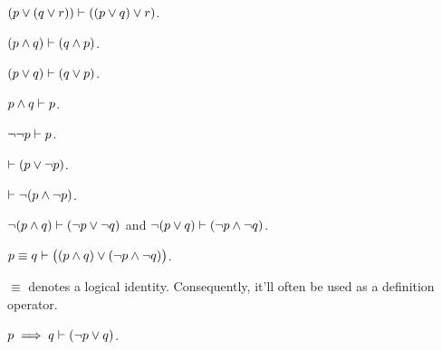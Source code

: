 \begin{definition}
  $(p \lor (q \lor r)) \vdash ((p \lor q) \lor r)$.
\end{definition}

\begin{definition}
  $(p \land q) \vdash (q \land p)$.
\end{definition}

\begin{definition}
  $(p \lor q) \vdash (q \lor p)$.
\end{definition}

\begin{definition}
  $p \land q \vdash p$.
\end{definition}

\begin{definition}
  $\neg\neg p \vdash p$.
\end{definition}

\indexsym{}
\begin{definition}
  $\vdash (p \lor \neg p)$.
\end{definition}

\begin{definition}
  $\vdash \neg(p \land \neg p)$.
\end{definition}

\begin{definition}
  $\neg(p \land q) \vdash (\neg p \lor \neg q)$
    and $\neg(p \lor q) \vdash (\neg p \land \neg q)$.
\end{definition}

\indexsym{}
\begin{definition}
  $p\equiv q \vdash \big((p \land q) \lor (\neg p \land \neg q)\big)$.
\end{definition}

$\equiv$ denotes a logical identity.
Consequently,
  it'll often be used as a definition operator.

\begin{definition}[Implication]
  $p\implies q \vdash (\neg p \lor q)$.
\end{definition}

